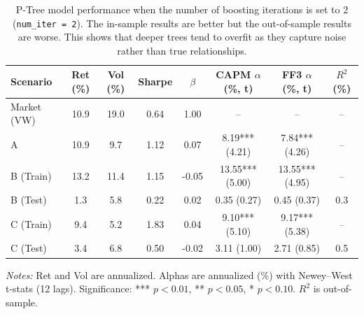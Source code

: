 \begin{table}[htbp]
\centering
\caption{P-Tree model performance when the number of boosting iterations is set to 2 (\texttt{num\_iter = 2}). The in-sample results are better but the out-of-sample results are worse. This shows that deeper trees tend to overfit as they capture noise rather than true relationships.}
\label{tab:performance_2splits}
\setlength{\tabcolsep}{3pt}
\renewcommand{\arraystretch}{1.0}
\small
\begin{tabular}{lccccccc}
\hline
Scenario & Ret (\%) & Vol (\%) & Sharpe & $\beta$ & CAPM $\alpha$ (\%, t) & FF3 $\alpha$ (\%, t) & $R^2$ (\%) \\
\hline
Market (VW) & 10.9 & 19.0 & 0.64 & 1.00 & -- & -- & -- \\
A & 10.9 & 9.7 & 1.12 & 0.07 & 8.19*** (4.21) & 7.84*** (4.26) & -- \\
B (Train) & 13.2 & 11.4 & 1.15 & -0.05 & 13.55*** (5.00) & 13.55*** (4.95) & -- \\
B (Test) & 1.3 & 5.8 & 0.22 & 0.02 & 0.35 (0.27) & 0.45 (0.37) & 0.3 \\
C (Train) & 9.4 & 5.2 & 1.83 & 0.04 & 9.10*** (5.10) & 9.17*** (5.38) & -- \\
C (Test) & 3.4 & 6.8 & 0.50 & -0.02 & 3.11 (1.00) & 2.71 (0.85) & 0.5 \\
\hline
\end{tabular}

\vspace{0.15cm}
\begin{minipage}{0.9\textwidth}
\footnotesize
\textit{Notes:} Ret and Vol are annualized. Alphas are annualized (\%) with Newey--West t-stats (12 lags). Significance: *** $p<0.01$, ** $p<0.05$, * $p<0.10$. $R^2$ is out-of-sample.
\end{minipage}
\end{table}
